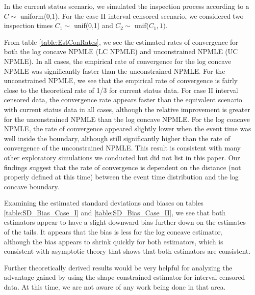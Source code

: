 	
	In the current status scenario, we simulated the inspection process according to a  $C \sim $ uniform(0,1).  For the case II interval censored scenario, we considered two inspection times $C_1 \sim$ unif(0,1) and $C_2 \sim$ unif($C_1, 1)$. 
		
	From table \ref{table:EstConRates}, we see the estimated rates of convergence for both the log concave NPMLE (LC NPMLE) and unconstrained NPMLE (UC NPMLE). In all cases, the empirical rate of convergence for the log concave NPMLE was significantly faster than the  unconstrained NPMLE. For the unconstrained NPMLE, we see that the empirical rate of convergence is fairly close to the theoretical rate of 1/3 for current status data. For case II interval censored data, the convergence rate appears faster than the equivalent scenario with current status data in all cases, although the relative improvement is greater for the unconstrained NPMLE than the log concave NPMLE. For the log concave NPMLE, the rate of convergence appeared slightly lower when the event time was well inside the boundary, although still significantly higher than the rate of convergence of the unconstrained NPMLE. This result is consistent with many other exploratory simulations we conducted but did not list in this paper. Our findings suggest that the rate of convergence is dependent on the distance (not properly defined at this time) between the event time distribution and the log concave boundary. 
	
	Examining the estimated standard deviations and biases on tables \ref{table:SD_Bias_Case_I} and \ref{table:SD_Bias_Case_II}, we see that both estimators appear to have a slight downward bias further down on the estimates of the tails. It appears that the bias is less for the log concave estimator, although the bias appears to shrink quickly for both estimators, which is consistent with asymptotic theory that shows that both estimators are consistent. 
	
	Further theoretically derived results would be very helpful for analyzing the advantage gained by using the shape constrained estimator for interval censored data. At this time, we are not aware of any work being done in that area. 
\\


